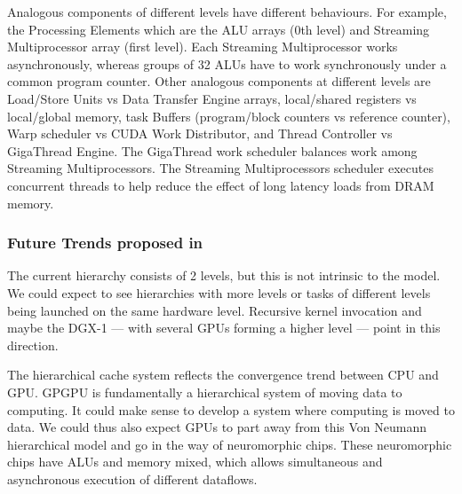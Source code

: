 Analogous components of different levels have different behaviours.
For example, the Processing Elements which are the ALU arrays (0th level) and Streaming Multiprocessor array (first level).
Each Streaming Multiprocessor works asynchronously, whereas groups of 32 ALUs have to work synchronously under a common program counter.
Other analogous components at different levels are Load/Store Units vs Data Transfer Engine arrays, local/shared registers vs local/global memory,
task Buffers (program/block counters vs reference counter), Warp scheduler vs CUDA Work Distributor, and Thread Controller vs GigaThread Engine.
The GigaThread work scheduler balances work among Streaming Multiprocessors.
The Streaming Multiprocessors scheduler executes concurrent threads to help reduce the effect of long latency loads from DRAM memory.

\subsubsection{Future Trends proposed in \cite{Hu:2016:CLG:2891449.2873053}}

The current hierarchy consists of 2 levels, but this is not intrinsic to the model.
We could expect to see hierarchies with more levels or tasks of different levels being launched on the same hardware level.
Recursive kernel invocation and maybe the DGX-1 --- with several GPUs forming a higher level --- point in this direction.

The hierarchical cache system reflects the convergence trend between CPU and GPU.
GPGPU is fundamentally a hierarchical system of moving data to computing.
It could make sense to develop a system where computing is moved to data.
We could thus also expect GPUs to part away from this Von Neumann hierarchical model and go in the way of neuromorphic chips.
These neuromorphic chips have ALUs and memory mixed, which allows simultaneous and asynchronous execution of different dataflows.
